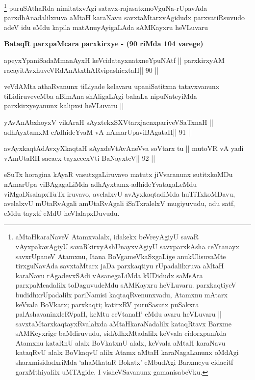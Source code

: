 \begin{artha}
\footnote[1]{aMtaHkaraNaveV Atamxvalalx, idakekx beVreyAgiyU savaR
  vAyxpakavAgiyU savaRkirxyAshUnayxvAgiyU savxparxkAsha ceYtanayx
  savxrUpaneV Atamxnu, Itana BoVgameVkaSxgaLige anukUlisuvaMte
  tirxguNavAda savxtaMtarx jaDa parxkaqtiyu rUpadalilxruva aMtaH
  karaNavu rAgadevxSAdi vAsanegaLiMda kUDidudx saMsAra parxpaMcadalilx
toDaguvudeMdu sAMKayxru heVLuvaru. parxkaqtiyeV budidhxrUpadalilx
pariNamisi kaqtaqRvenunxvadu, Atamxnu mAtarx keVvala BoVkatx;
parxkaqti; katirxRV puruSasutx puSakxra palAshavaninxleRVpaH, keMtu
ceVtanaH' eMdu avaru heVLuvaru || savxtaMtarxkaqtayxRvalalxda
aMtaHkaraNadalilx kataqRtavx Barxme sAMKeyxrige baMdiruvudu,
sidAdhxMtadalilx keVvala cidorxpanAda Atamxnu kataRnU alalx BoVkatxnU
alalx, keVvala aMtaH karaNavu kataqRvU alalx BoVkaqvU alilx Atamx
aMtaH karaNagaLanunx oMdAgi sharxmisidadxriMda `ahaMkataR Bokatx'
eMbudAgi Barxmeyu cidacitf garxMthiyalilx uMTAgide. I visheVSavanunx gamanisabeVku.}
puruSAthaRda nimitatxvAgi
satavx-rajasatxmoVguNa-rUpavAda parxdhAnadalilxruva aMtaH karaNavu
savxtaMtarxvAgidudx parxvatiRsuvudo adeV idu eMdu kapila
matAnuyAyigaLAda sAMKayxru heVLuvaru
\end{artha}

{\centerline{\textbf{BataqR parxpaMcara parxkirxye - (90 riMda 104 varege)}}}

\begin{shl}
apeyxYpaniSadaMmanAyxH keVcidatayxnatxneYpuNAtf ||
parxkirxyAM racayitAvx\s\s huveVRdAnAtxthARvipashicxtaH\hfill || 90 ||
\end{shl}

\begin{artha}
veVdAMta athaRvanunx tiLiyade kelavaru upaniSatitxna tatavxvanunx
tiLidiruveveMba aBimAna shAligaLAgi bahaLa nipuNateyiMda
parxkirxyeyanunx kalipxsi heVLuvaru ||
\end{artha}

\begin{shl}
yAvAnAbxhoyxV vikAraH sAyxtekxSXVtarxjacnxpariveVSaTxnaH ||
adhAyxtamxM cAdhideYvaM vA nAmarUpaviBAgataH\hfill || 91 ||
\end{shl}

\begin{shl}
avAyxkaqtAdAvxyXkaqtaH sAyxdeVtAvAneVva soV\s tarx tu ||
mutoVR vA yadi vA\s mUtaRH sacacx tayxcecxVti BaNayxteV\hfill || 92 ||
\end{shl}

\begin{artha}
eSuTx horagina kAyaR vasutxgaLiruvavo matutx jiVvaranunx sutitxkoMDu
nAmarUpa viBAgagaLiMda adhAyxtamx-adhideYvatagaLeMdu viMgaDisalapxTuTx
iruvavo, avelalxvU avAyxkaqtadiMda huTiTxkoMDavu, avelalxvU
mUtaRvAgali amUtaRvAgali iSaTxralelxV mugiyuvudu, adu satf, eMdu
tayxtf eMdU heVlalapxDuvudu.
\end{artha}

